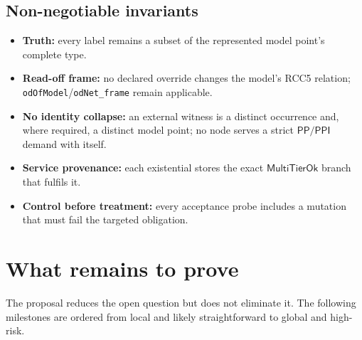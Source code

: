 \documentclass[11pt,letterpaper]{article}
\newcommand{\PP}{\ensuremath{\mathsf{PP}}}
\newcommand{\PPI}{\ensuremath{\mathsf{PPI}}}
\newcommand{\MultiTierOk}{\ensuremath{\mathsf{MultiTierOk}}}
\newcommand{\code}[1]{\nolinkurl{#1}}
\theoremstyle{definition}
\theoremstyle{plain}
\theoremstyle{remark}
\begin{document}
\subsection{Non-negotiable invariants}

\begin{itemize}
  \item \textbf{Truth:} every label remains a subset of the represented model
        point's complete type.
  \item \textbf{Read-off frame:} no declared override changes the model's RCC5
        relation; \code{odOfModel}/\code{odNet_frame} remain applicable.
  \item \textbf{No identity collapse:} an external witness is a distinct
        occurrence and, where required, a distinct model point; no node serves a
        strict $\PP/\PPI$ demand with itself.
  \item \textbf{Service provenance:} each existential stores the exact
        \MultiTierOk{} branch that fulfils it.
  \item \textbf{Control before treatment:} every acceptance probe includes a
        mutation that must fail the targeted obligation.
\end{itemize}

\section{What remains to prove}

The proposal reduces the open question but does not eliminate it.  The following
milestones are ordered from local and likely straightforward to global and
high-risk.
\end{document}
